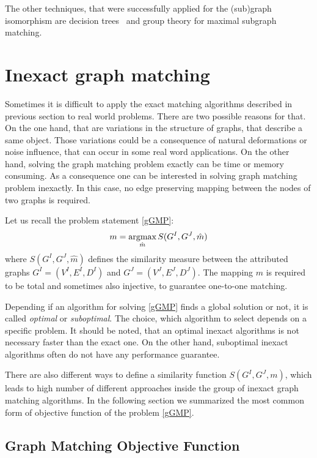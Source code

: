 The other techniques, that were successfully applied for the (sub)graph isomorphism are decision trees~\cite{Messmer1999,Shearer1998,Shearer2001} and group theory\cite{McKay} for maximal subgraph matching. 

\section{Inexact graph matching}

Sometimes it is difficult to apply the exact matching algorithms described in previous section to real world problems. There are two possible reasons for that. On the one hand, that are variations in the structure of graphs, that describe a same object. Those variations could be a consequence of natural deformations or noise influence, that can occur in some real word applications. On the other hand, solving the graph matching problem exactly can be time or memory consuming. As a consequence one can be interested in solving graph matching problem inexactly. In this case, no edge preserving mapping between the nodes of two graphs is required.

Let us recall the problem statement \eqref{gGMP}: 
\begin{equation*}
m = \mathop{\rm argmax}_{\hat{m}}S(G^I, G^J, \hat{m})
\end{equation*}
where $S(G^I, G^J, \hat{m})$ defines the similarity measure between the attributed graphs $G^I = (V^I, E^I,D^I)$ and $G^J = (V^J, E^J,D^J)$. The mapping $m$ is required to be total and sometimes also injective, to guarantee one-to-one matching.

Depending if an algorithm for solving \eqref{gGMP} finds a global solution or not, it is called \emph{optimal} or \emph{suboptimal}. The choice, which algorithm to select depends on a specific problem. It should be noted, that an optimal inexact algorithms is not necessary faster than the exact one. On the other hand, suboptimal inexact algorithms often do not have any performance guarantee.

There are also different ways to define a similarity function $S(G^I,G^J,m)$, which leads to high number of different approaches inside the group of inexact graph matching algorithms. In the following section we summarized the most common form of objective function of the problem \eqref{gGMP}.

\subsection{Graph Matching Objective Function}

